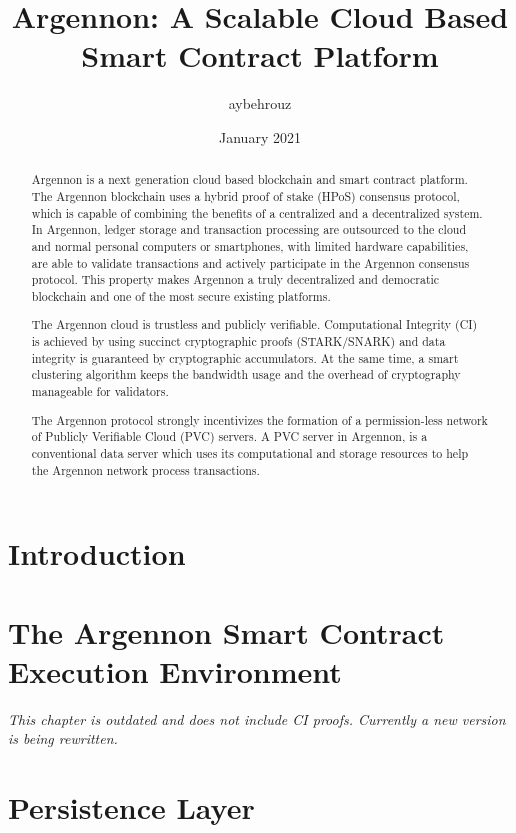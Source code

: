 \documentclass[11pt, a4paper]{report}
\title{Argennon: A Scalable Cloud Based Smart Contract Platform}
\author{aybehrouz}
\date{January 2021}
\newcommand{\note}[1] {
    \begin{tcolorbox}[colframe=white,colback=white]
        \emph{#1}
    \end{tcolorbox}
}
\begin{document}
    \maketitle
    \begin{abstract}
        Argennon is a next generation cloud based blockchain and smart
        contract platform. The Argennon blockchain uses
        a hybrid proof of stake (HPoS) consensus protocol, which is capable of combining the benefits of
        a centralized and a decentralized system. In Argennon, ledger storage and transaction processing are
        outsourced to the cloud and normal personal computers or smartphones, with limited hardware
        capabilities, are able to validate transactions and actively
        participate in the Argennon consensus protocol. This property makes Argennon a truly decentralized and
        democratic blockchain and one of the most secure existing platforms.

        The Argennon cloud is trustless and publicly verifiable. Computational Integrity (CI) is
        achieved by using succinct cryptographic proofs (STARK/SNARK)
        and data integrity is guaranteed by cryptographic accumulators. At the same time, a smart
        clustering algorithm keeps the bandwidth usage and the overhead of cryptography manageable
        for validators.

        The Argennon protocol strongly incentivizes the formation of a permission-less network of Publicly Verifiable
        Cloud (PVC) servers. A PVC server in Argennon, is a conventional data server which uses its computational and
        storage resources to help the Argennon network process transactions.

    \end{abstract}
    \tableofcontents


    \chapter{Introduction}\label{ch:intro}
    

    \chapter{The Argennon Smart Contract Execution Environment}\label{ch:AVM}
    \note{This chapter is outdated and does not include CI proofs. Currently a new version is being rewritten.}
    


    \chapter{Persistence Layer}\label{ch:persistance}
    
\end{document}
